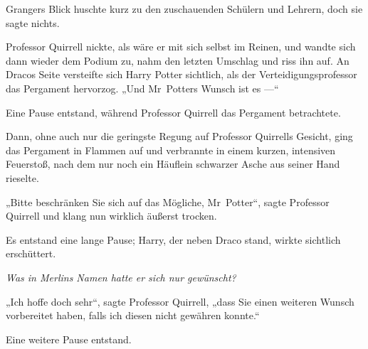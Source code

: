 Grangers Blick huschte kurz zu den zuschauenden Schülern und Lehrern, doch sie sagte nichts.

Professor Quirrell nickte, als wäre er mit sich selbst im Reinen, und wandte sich dann wieder dem Podium zu, nahm den letzten Umschlag und riss ihn auf. An Dracos Seite versteifte sich Harry Potter sichtlich, als der Verteidigungsprofessor das Pergament hervorzog.
„Und Mr~Potters Wunsch ist es —“

Eine Pause entstand, während Professor Quirrell das Pergament betrachtete.

Dann, ohne auch nur die geringste Regung auf Professor Quirrells Gesicht, ging das Pergament in Flammen auf und verbrannte in einem kurzen, intensiven Feuerstoß, nach dem nur noch ein Häuflein schwarzer Asche aus seiner Hand rieselte.

„Bitte beschränken Sie sich auf das Mögliche, Mr~Potter“, sagte Professor Quirrell und klang nun wirklich äußerst trocken.

Es entstand eine lange Pause; Harry, der neben Draco stand, wirkte sichtlich erschüttert.

\emph{Was in Merlins Namen hatte er sich nur gewünscht?}

„Ich hoffe doch sehr“, sagte Professor Quirrell, „dass Sie einen weiteren Wunsch vorbereitet haben, falls ich diesen nicht gewähren konnte.“

Eine weitere Pause entstand.

